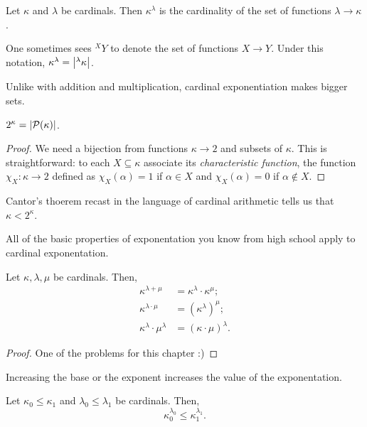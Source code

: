 \documentclass[10pt]{amsart}
\begin{document}
\begin{definition}
Let $\kappa$ and $\lambda$ be cardinals. Then $\kappa^\lambda$ is the cardinality of the set of functions $\lambda \to \kappa$.
\end{definition}

One sometimes sees ${}^XY$ to denote the set of functions $X \to Y$. Under this notation, $\kappa^\lambda = \left\lvert {}^\lambda\kappa \right\rvert$.

Unlike with addition and multiplication, cardinal exponentiation makes bigger sets.

\begin{proposition}
$2^\kappa = \left\lvert \mathcal{P}(\kappa) \right\rvert$.
\end{proposition}

\begin{proof}
We need a bijection from functions $\kappa \to 2$ and subsets of $\kappa$. This is straightforward: to each $X \subseteq \kappa$ associate its \emph{characteristic function}, the function $\chi_X : \kappa \to 2$ defined as $\chi_X(\alpha) = 1$ if $\alpha \in X$ and $\chi_X(\alpha) = 0$ if $\alpha \not \in X$.
\end{proof}

Cantor's thoerem recast in the language of cardinal arithmetic tells us that $\kappa < 2^\kappa$. 

All of the basic properties of exponentation you know from high school apply to cardinal exponentation. 

\begin{proposition}
Let $\kappa, \lambda, \mu$ be cardinals. Then,
\begin{align*}
\kappa^{\lambda + \mu} &= \kappa^\lambda \cdot \kappa^\mu; \\
\kappa^{\lambda \cdot \mu} &= \left(\kappa^\lambda\right)^\mu; \\
\kappa^\lambda \cdot \mu^\lambda &= (\kappa \cdot \mu)^\lambda.
\end{align*}
\end{proposition}

\begin{proof}
One of the problems for this chapter :)
\end{proof}

Increasing the base or the exponent increases the value of the exponentation.

\begin{proposition}
Let $\kappa_0 \le \kappa_1$ and $\lambda_0 \le \lambda_1$ be cardinals. Then,
\[
\kappa_0^{\lambda_0} \le \kappa_1^{\lambda_1}.
\]
\end{proposition}
\end{document}

